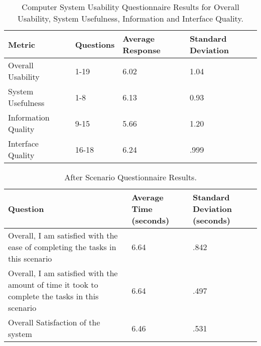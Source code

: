 \documentclass[twocolumn]{bmcart}%
\begin{document}
\begin{backmatter}
\begin{table}[h!]
\caption{Computer System Usability Questionnaire Results for Overall Usability, System Usefulness, Information and Interface Quality.}
      \begin{tabular}{L{2.5cm}lR{1.2cm}R{1.2cm}}
      \hline
      Metric & Questions & Average Response & Standard Deviation \\ \hline
  		Overall Usability   &  1-19 & 6.02 & 1.04 \\ 
      System Usefulness   &  1-8  & 6.13 & 0.93 \\ 
      Information Quality &  9-15 & 5.66 & 1.20 \\ 
      Interface Quality   & 16-18 & 6.24 & .999 \\ \hline
      \end{tabular}
\label{tbl:CSUQOverallUsabilityResults}
\end{table}

\begin{table}[h!]
\caption{After Scenario Questionnaire Results.}
      \begin{tabular}{L{3.85cm}R{1.2cm}R{1.2cm}}
      \hline
      Question & Average Time (seconds) & Standard Deviation (seconds)\\ \hline
      Overall, I am satisfied with the ease of completing the tasks in this scenario & 6.64 & .842 \\
      Overall, I am satisfied with the amount of time it took to complete the tasks in this scenario & 6.64 & .497 \\
      Overall Satisfaction of the system & 6.46 & .531 \\ \hline
      \end{tabular}
\label{tbl:ASQResults}
\end{table}



%


\end{backmatter}
\end{document}
